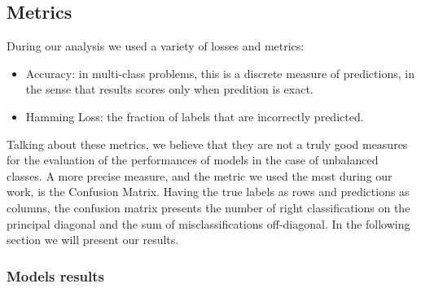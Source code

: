 \documentclass[12pt]{article}
\begin{document}
\newpage
\subsection{Metrics}
During our analysis we used a variety of losses and metrics:

\begin{itemize}
\item Accuracy: in multi-class problems, this is a discrete measure of predictions, in the sense that results scores only when predition is exact.
\item Hamming Loss: the fraction of labels that are incorrectly predicted.
\end{itemize}

Talking about these metrics, we believe that they are not a truly good measures for the evaluation of the performances of models in the case of unbalanced classes. A more precise measure, and the metric we used the most during our work, is the Confusion Matrix. Having the true labels as rows and predictions as columns, the confusion matrix presents the number of right classifications on the principal diagonal and the sum of misclassifications off-diagonal. In the following section we will present our results.

\subsubsection{Models results}
\end{document}
